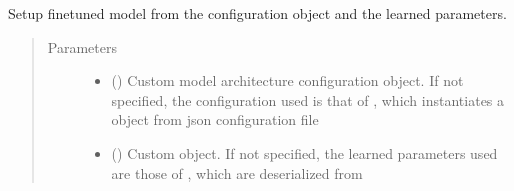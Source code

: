 \documentclass[letterpaper,10pt,english]{sphinxmanual}
\begin{document}
\begin{fulllineitems}

\begin{fulllineitems}
\label{\detokenize{code:gpt2_summarizer_inference.InferenceGPT2Summarizer.setup_model}}
\sphinxAtStartPar
Setup fine\sphinxhyphen{}tuned model from the configuration object and the learned parameters.
\begin{quote}\begin{description}
\item[{Parameters}] \leavevmode\begin{itemize}
\item {} 
\sphinxAtStartPar
{} (\sphinxstyleliteralemphasis{\sphinxupquote{, }}) \textendash{} Custom model architecture configuration object. If not specified, the configuration
used is that of , which instantiates a  object from
 json configuration file

\item {} 
\sphinxAtStartPar
{} (\sphinxstyleliteralemphasis{\sphinxupquote{, }}) \textendash{} Custom  object. If not specified, the learned parameters used are those
of , which are deserialized from 

\end{itemize}

\end{description}\end{quote}

\end{fulllineitems}


\end{fulllineitems}
\end{document}
